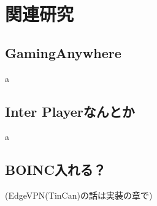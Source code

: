 \section{関連研究}

\subsection{GamingAnywhere}
a
\subsection{Inter Playerなんとか}
a
\subsection{BOINC入れる？}
(EdgeVPN(TinCan)の話は実装の章で)